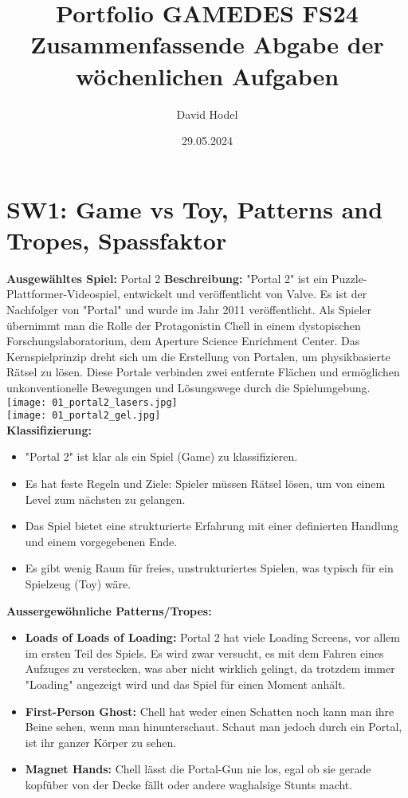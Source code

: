 \documentclass{article}
\title{%
Portfolio GAMEDES FS24\\
\large Zusammenfassende Abgabe der \\
  wöchenlichen Aufgaben}
\author{David Hodel}
\date{29.05.2024}
\begin{document}
\maketitle
\newpage

\tableofcontents
\newpage

\section{SW1: Game vs Toy, Patterns and Tropes, Spassfaktor}

\textbf{Ausgewähltes Spiel:} Portal 2
\textbf{Beschreibung:} "Portal 2" ist ein Puzzle-Plattformer-Videospiel, entwickelt und veröffentlicht von Valve.
Es ist der Nachfolger von "Portal" und wurde im Jahr 2011 veröffentlicht. Als Spieler übernimmt man die Rolle der Protagonistin
Chell in einem dystopischen Forschungslaboratorium, dem Aperture Science Enrichment Center. Das Kernspielprinzip dreht sich um die
Erstellung von Portalen, um physikbasierte Rätsel zu lösen. Diese Portale verbinden zwei entfernte Flächen und ermöglichen
unkonventionelle Bewegungen und Lösungswege durch die Spielumgebung.
\\
\texttt{[image: 01\_portal2\_lasers.jpg]}
\\
\texttt{[image: 01\_portal2\_gel.jpg]}
\\
\textbf{Klassifizierung:}
\begin{itemize}
    \item "Portal 2" ist klar als ein Spiel (Game) zu klassifizieren.
    \item Es hat feste Regeln und Ziele: Spieler müssen Rätsel lösen, um von einem Level zum nächsten zu gelangen.
    \item Das Spiel bietet eine strukturierte Erfahrung mit einer definierten Handlung und einem vorgegebenen Ende.
    \item Es gibt wenig Raum für freies, unstrukturiertes Spielen, was typisch für ein Spielzeug (Toy) wäre.
\end{itemize}
\bigskip
\textbf{Aussergewöhnliche Patterns/Tropes:}
\begin{itemize}
    \item \textbf{Loads of Loads of Loading:} Portal 2 hat viele Loading Screens, vor allem im ersten Teil des Spiels.
    Es wird zwar versucht, es mit dem Fahren eines Aufzuges zu verstecken, was aber nicht wirklich gelingt, da trotzdem immer
    "Loading" angezeigt wird und das Spiel für einen Moment anhält.
    \item \textbf{First-Person Ghost:} Chell hat weder einen Schatten noch kann man ihre Beine sehen, wenn man hinunterschaut.
    Schaut man jedoch durch ein Portal, ist ihr ganzer Körper zu sehen.
    \item \textbf{Magnet Hands:} Chell lässt die Portal-Gun nie los, egal ob sie gerade kopfüber von der Decke fällt oder andere
    waghalsige Stunts macht.
\end{itemize}
\end{document}
